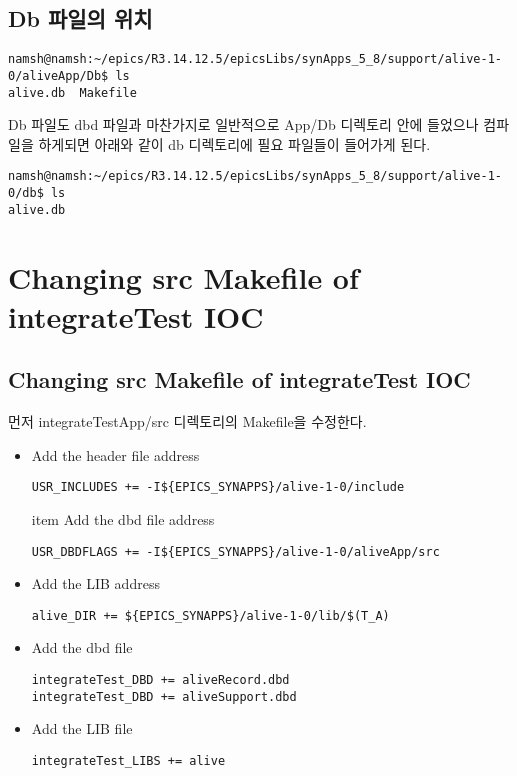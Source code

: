 \documentclass[11pt
  , a4paper
  , article
  , oneside
]{memoir}
\begin{document}
\subsection{Db 파일의 위치}
\begin{lstlisting}[style=termstyle]
namsh@namsh:~/epics/R3.14.12.5/epicsLibs/synApps_5_8/support/alive-1-0/aliveApp/Db$ ls
alive.db  Makefile
\end{lstlisting}
Db 파일도 dbd 파일과 마찬가지로 일반적으로 App/Db 디렉토리 안에 들었으나 컴파일을 하게되면 아래와 같이 db 디렉토리에 필요 파일들이 들어가게 된다.
\begin{lstlisting}[style=termstyle]
namsh@namsh:~/epics/R3.14.12.5/epicsLibs/synApps_5_8/support/alive-1-0/db$ ls
alive.db
\end{lstlisting}
\section{Changing src Makefile of integrateTest IOC}
\subsection{Changing src Makefile of integrateTest IOC}
먼저 integrateTestApp/src 디렉토리의 Makefile을 수정한다.
\begin{itemize}
	\item Add the header file address
\begin{lstlisting}[style=termstyle]
USR_INCLUDES += -I${EPICS_SYNAPPS}/alive-1-0/include
\end{lstlisting}
item Add the dbd file address
\begin{lstlisting}[style=termstyle]
USR_DBDFLAGS += -I${EPICS_SYNAPPS}/alive-1-0/aliveApp/src
\end{lstlisting}
\item Add the LIB address
\begin{lstlisting}[style=termstyle]
alive_DIR += ${EPICS_SYNAPPS}/alive-1-0/lib/$(T_A)
\end{lstlisting}
\item Add the dbd file
\begin{lstlisting}[style=termstyle]
integrateTest_DBD += aliveRecord.dbd   
integrateTest_DBD += aliveSupport.dbd
\end{lstlisting}
\item Add the LIB file
\begin{lstlisting}[style=termstyle]
integrateTest_LIBS += alive
\end{lstlisting}
\end{itemize}
\end{document}
